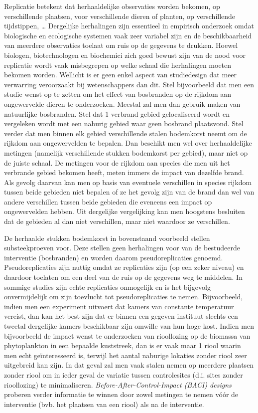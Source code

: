 \documentclass[
  12pt,dutch,coursenotes]{book}
\begin{document}
Replicatie betekent dat herhaaldelijke observaties worden bekomen, op verschillende plaatsen, voor verschillende dieren of planten, op verschillende tijdstippen, \ldots{} Dergelijke herhalingen zijn essentieel in empirisch onderzoek omdat biologische en ecologische systemen vaak zeer variabel zijn en de beschikbaarheid van meerdere observaties toelaat om ruis op de gegevens te drukken. Hoewel biologen, biotechnologen en biochemici zich goed bewust zijn van de nood voor replicatie wordt vaak misbegrepen op welke schaal die herhalingen moeten bekomen worden. Wellicht is er geen enkel aspect van studiedesign dat meer verwarring veroorzaakt bij wetenschappers dan dit. Stel bijvoorbeeld dat men een studie wenst op te zetten om het effect van bosbranden op de rijkdom aan ongewervelde dieren te onderzoeken. Meestal zal men dan gebruik maken van natuurlijke bosbranden. Stel dat 1 verbrand gebied gelocaliseerd wordt en vergeleken wordt met een naburig gebied waar geen bosbrand plaatsvond. Stel verder dat men binnen elk gebied verschillende stalen bodemkorst neemt om de rijkdom aan ongewervelden te bepalen. Dan beschikt men wel over herhaaldelijke metingen (namelijk verschillende stukken bodemkorst per gebied), maar niet op de juiste schaal. De metingen voor de rijkdom aan species die men uit het verbrande gebied bekomen heeft, meten immers de impact van dezelfde brand. Als gevolg daarvan kan men op basis van eventuele verschillen in species rijkdom tussen beide gebieden niet bepalen of ze het gevolg zijn van de brand dan wel van andere verschillen tussen beide gebieden die eveneens een impact op ongewervelden hebben. Uit dergelijke vergelijking kan men hoogstens besluiten dat de gebieden al dan niet verschillen, maar niet waardoor ze verschillen.

De herhaalde stukken bodemkorst in bovenstaand voorbeeld stellen substeekproeven voor. Deze stellen geen herhalingen voor van de bestudeerde interventie (bosbranden) en worden daarom pseudoreplicaties genoemd. Pseudoreplicaties zijn nuttig omdat ze replicaties zijn (op een zeker niveau) en daardoor toelaten om een deel van de ruis op de gegevens weg te middelen. In sommige studies zijn echte replicaties onmogelijk en is het bijgevolg onvermijdelijk om zijn toevlucht tot pseudoreplicaties te nemen. Bijvoorbeeld, indien men een experiment uitvoert dat kamers van constante temperatuur vereist, dan kan het best zijn dat er binnen een gegeven instituut slechts een tweetal dergelijke kamers beschikbaar zijn omwille van hun hoge kost. Indien men bijvoorbeeld de impact wenst te onderzoeken van rioollozing op de biomassa van phytoplankton in een bepaalde kuststreek, dan is er vaak maar 1 riool waarin men echt geïnteresseerd is, terwijl het aantal naburige lokaties zonder riool zeer uitgebreid kan zijn. In dat geval zal men vaak stalen nemen op meerdere plaatsen zonder riool om in ieder geval de variatie tussen controlesites (d.i. sites zonder rioollozing) te minimaliseren. \emph{Before-After-Control-Impact (BACI) designs} proberen verder informatie te winnen door zowel metingen te nemen vóór de interventie (bvb. het plaatsen van een riool) als na de interventie.
\end{document}
